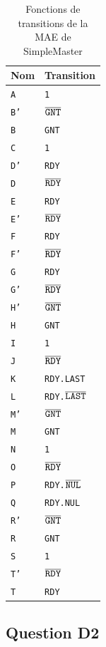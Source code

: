 \documentclass{article}
\begin{document}
\begin{table}[H]
\centering
\begingroup
\setlength{\tabcolsep}{5pt}
\renewcommand{\arraystretch}{1.1}
\begin{tabular}{ | l | l | }
\hline
Nom    &   Transition  \\
\hline
\tt{A}  & \tt{1} \\
\tt{B'} & \tt{$\overline{\tt{GNT}}$} \\
\tt{B}  & \tt{GNT} \\
\hline
\tt{C}  & \tt{1} \\
\tt{D'} & \tt{RDY} \\
\tt{D}  & \tt{$\overline{\tt{RDY}}$} \\
\tt{E}  & \tt{RDY} \\
\tt{E'} & \tt{$\overline{\tt{RDY}}$} \\
\tt{F}  & \tt{RDY} \\
\tt{F'} & \tt{$\overline{\tt{RDY}}$} \\
\tt{G}  & \tt{RDY} \\
\tt{G'} & \tt{$\overline{\tt{RDY}}$} \\
\hline
\tt{H'} & \tt{$\overline{\tt{GNT}}$} \\
\tt{H}  & \tt{GNT} \\
\tt{I}  & \tt{1} \\
\tt{J}  & \tt{$\overline{\tt{RDY}}$} \\
\tt{K}  & \tt{RDY.LAST} \\
\tt{L}  & \tt{RDY.$\overline{\tt{LAST}}$} \\
\hline
\tt{M'} & \tt{$\overline{\tt{GNT}}$} \\
\tt{M}  & \tt{GNT} \\
\tt{N}  & \tt{1} \\
\tt{O}  & \tt{$\overline{\tt{RDY}}$} \\
\tt{P}  & \tt{RDY.$\overline{\tt{NUL}}$} \\
\tt{Q}  & \tt{RDY.NUL} \\
\hline
\tt{R'} & \tt{$\overline{\tt{GNT}}$} \\
\tt{R}  & \tt{GNT} \\
\tt{S}  & \tt{1} \\
\tt{T'} & \tt{$\overline{\tt{RDY}}$} \\
\tt{T}  & \tt{RDY} \\
\hline
\end{tabular}
\endgroup
\caption{Fonctions de transitions de la MAE de SimpleMaster}
\end{table}

\subsection{Question D2}
\end{document}
